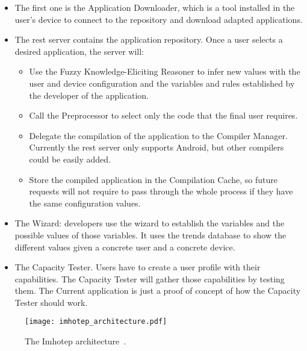 \begin{itemize}
    \item The first one is the Application Downloader, which is a tool installed
    in the user's device to connect to the repository and download adapted
    applications.
    
    \item The \ac{rest} server contains the application repository. Once a user 
    selects a desired application, the server will:
    
    \begin{itemize}
      \item Use the Fuzzy Knowledge-Eliciting Reasoner to infer new values with
      the user and device configuration and the variables and rules established
      by the developer of the application.
      
      \item Call the Preprocessor to select only the code that the final user
      requires.
      
      \item Delegate the compilation of the application to the Compiler Manager.
      Currently the \ac{rest} server only supports Android, but other compilers could
      be easily added.
      
      \item Store the compiled application in the Compilation Cache, so future
      requests will not require to pass through the whole process if they have
      the same configuration values.
    \end{itemize}
    
  \item The Wizard: developers use the wizard to establish the variables and the
  possible values of those variables. It uses the trends database to show the
  different values given a concrete user and a concrete device.
  
  \item The Capacity Tester. Users have to create a user profile with their
  capabilities. The Capacity Tester will gather those capabilities by testing
  them. The Current application is just a proof of concept of how the Capacity
  Tester should work.
\end{itemize}

\begin{figure}
\centering
\texttt{[image: imhotep\_architecture.pdf]}
\caption{The Imhotep architecture~\citep{imhotep_website}.}
\label{fig:imhotep_architecture}
\end{figure}

